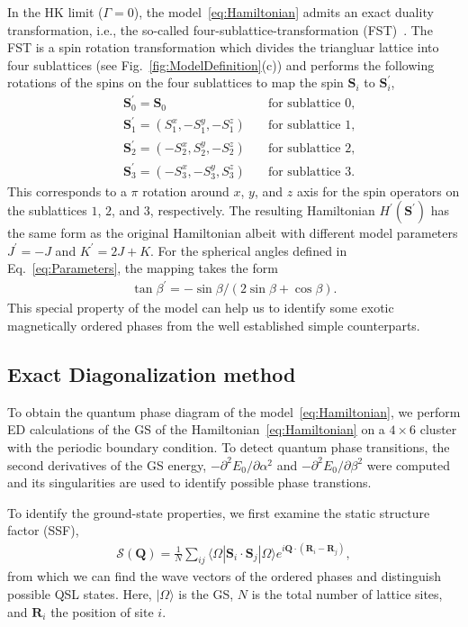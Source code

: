 \documentclass[aps,prb,reprint,amsfonts,amsmath,amssymb,showpacs,groupedaddress,superscriptaddress]{revtex4-1}
\begin{document}
In the HK limit ($\Gamma=0$), the model~\eqref{eq:Hamiltonian} admits an exact duality transformation, i.e., the so-called four-sublattice-transformation (FST)~\cite{PhysRevB.89.014414}. The FST is a spin rotation transformation which divides the triangluar lattice into four sublattices (see Fig.~\ref{fig:ModelDefinition}(c)) and performs the following rotations of the spins on the four sublattices to map the spin $\bm{S}_{i}$ to $\bm{S}_{i}^{\prime}$,
\begin{align*}
    & \bm{S}_{0}^{\prime} = \bm{S}_{0}& \quad \text{for sublattice 0}, \\
    & \bm{S}_{1}^{\prime} = (S_1^x, -S_1^y, -S_1^z)& \quad \text{for sublattice 1}, \\
    & \bm{S}_{2}^{\prime} = (-S_2^x, S_2^y, -S_2^z)& \quad \text{for sublattice 2}, \\
    & \bm{S}_{3}^{\prime} = (-S_3^x, -S_3^y, S_3^z)& \quad \text{for sublattice 3}.
\end{align*}
This corresponds to a $\pi$ rotation around $x$, $y$, and $z$ axis for the spin operators on the sublattices $1$, $2$, and $3$, respectively. The resulting Hamiltonian $H^{\prime}(\bm{S}^{\prime})$ has the same form as the original Hamiltonian albeit with different model parameters $J^{\prime} = -J$ and $K^{\prime} = 2J + K$. For the spherical angles defined in Eq.~\eqref{eq:Parameters}, the mapping takes the form
\begin{align}
    \tan\beta^{\prime} = -\sin\beta / (2\sin\beta + \cos\beta).
    \label{eq:FST}
\end{align}
This special property of the model can help us to identify some exotic magnetically ordered phases from the well established simple counterparts.

\subsection{\label{subsec:MethodED}Exact Diagonalization method}

To obtain the quantum phase diagram of the model~\eqref{eq:Hamiltonian}, we perform ED calculations of the GS of the Hamiltonian~\eqref{eq:Hamiltonian} on a $4 \times 6$ cluster with the periodic boundary condition. To detect quantum phase transitions, the second derivatives of the GS energy, $-\partial^2E_0/\partial\alpha^2$ and $-\partial^2E_0/\partial\beta^2$ were computed and its singularities are used to identify possible phase transtions.

To identify the ground-state properties, we first examine the static structure factor (SSF),
\begin{align}
    \mathcal{S}(\bm{Q}) = \frac{1}{N} \sum_{ij} \langle \Omega | \bm{S}_i \cdot \bm{S}_j | \Omega \rangle e^{i \bm{Q} \cdot (\bm{R}_i - \bm{R}_j)},
    \label{eq:SSF}
\end{align}
from which we can find the wave vectors of the ordered phases and distinguish possible QSL states. Here, $|\Omega\rangle$ is the GS, $N$ is the total number of lattice sites, and $\bm{R}_i$ the position of site $i$.
\end{document}
